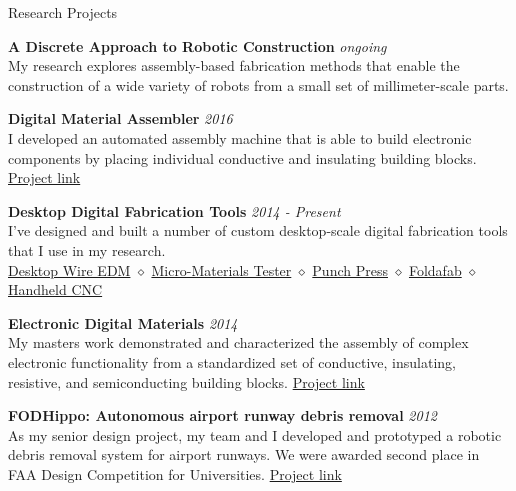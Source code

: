 \documentclass{resume} %
\begin{document}
\begin{rSection}{Research Projects}

{\bf A Discrete Approach to Robotic Construction} \hfill {\em ongoing}
\\My research explores assembly-based fabrication methods that enable the construction of a wide variety of robots from a small set of millimeter-scale parts.

{\bf Digital Material Assembler} \hfill {\em 2016}
\\I developed an automated assembly machine that is able to build electronic components by placing individual conductive and insulating building blocks. \href{http://www.willlangford.me/stapler/index.html}{Project link}

{\bf Desktop Digital Fabrication Tools} \hfill {\em 2014 - Present}
\\I've designed and built a number of custom desktop-scale digital fabrication tools that I use in my research.
\\\href{https://langfordw.pages.cba.mit.edu/desktopWEDM}{Desktop Wire EDM} $\diamond$
\href{http://www.willlangford.me/tabletopInstron/index.html}{Micro-Materials Tester} $\diamond$
\href{http://fab.cba.mit.edu/classes/865.15/people/will.langford/9_processors/index.html}{Punch Press} $\diamond$
\href{http://www.willlangford.me/foldafab/index.html}{Foldafab} $\diamond$
\href{http://www.willlangford.me/handheld_cnc/index.html}{Handheld CNC}

{\bf Electronic Digital Materials} \hfill {\em 2014}
\\My masters work demonstrated and characterized the assembly of complex electronic functionality from a standardized set of conductive, insulating, resistive, and semiconducting building blocks. \href{http://www.willlangford.me/electronic_digital_materials/index.html}{Project link}

{\bf FODHippo: Autonomous airport runway debris removal} \hfill {\em 2012}
\\As my senior design project, my team and I developed and prototyped a robotic debris removal system for airport runways. We were awarded second place in FAA Design Competition for Universities. \href{http://www.willlangford.me/hippo/index.html}{Project link}



\end{rSection}
\end{document}
